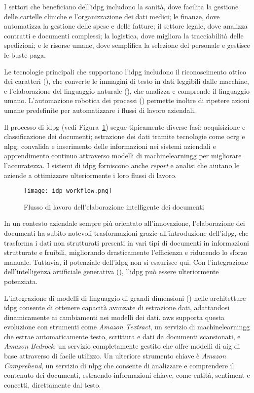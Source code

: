 I settori che beneficiano dell'\gls{idpg} includono la sanità, dove facilita la gestione delle cartelle cliniche e l'organizzazione dei dati medici; le finanze, dove automatizza la gestione delle spese e delle fatture; il settore legale, dove analizza contratti e documenti complessi; la logistica, dove migliora la tracciabilità delle spedizioni; e le risorse umane, dove semplifica la selezione del personale e gestisce le buste paga.

Le tecnologie principali che supportano l'\gls{idpg} includono il riconoscimento ottico dei caratteri (), che converte le immagini di testo in dati leggibili dalle macchine, e l'elaborazione del linguaggio naturale (), che analizza e comprende il linguaggio umano. L'automazione robotica dei processi () permette inoltre di ripetere azioni umane predefinite per automatizzare i flussi di lavoro aziendali.

Il processo di \gls{idpg} (vedi Figura~\ref{fig:idp_workflow}) segue tipicamente diverse fasi: acquisizione e classificazione dei documenti; estrazione dei dati tramite tecnologie come \gls{ocrg} e \gls{nlpg}; convalida e inserimento delle informazioni nei sistemi aziendali e apprendimento continuo attraverso modelli di \gls{machinelearningg} per migliorare l'accuratezza. I sistemi di \gls{idpg} forniscono anche \emph{report} e analisi che aiutano le aziende a ottimizzare ulteriormente i loro flussi di lavoro.

\begin{figure}[!ht]
    \centering
    \texttt{[image: idp\_workflow.png]}
    \caption{Flusso di lavoro dell'elaborazione intelligente dei documenti}
    \label{fig:idp_workflow}
\end{figure}

In un contesto aziendale sempre più orientato all'innovazione, l'elaborazione dei documenti ha subito notevoli trasformazioni grazie all'introduzione dell'\gls{idpg}, che trasforma i dati non strutturati presenti in vari tipi di documenti in informazioni strutturate e fruibili, migliorando drasticamente l'efficienza e riducendo lo sforzo manuale. Tuttavia, il potenziale dell'\gls{idpg} non si esaurisce qui. Con l'integrazione dell'intelligenza artificiale generativa (), l'\gls{idpg} può essere ulteriormente potenziata.

L'integrazione di modelli di linguaggio di grandi dimensioni () nelle architetture \gls{idpg} consente di ottenere capacità avanzate di estrazione dati, adattandosi dinamicamente ai cambiamenti nei modelli dei dati. \gls{aws} supporta questa evoluzione con strumenti come \emph{Amazon Textract}, un servizio di \gls{machinelearningg} che estrae automaticamente testo, scrittura e dati da documenti scansionati, e \emph{Amazon Bedrock}, un servizio completamente gestito che offre modelli di \gls{aig} di base attraverso  di facile utilizzo. Un ulteriore strumento chiave è \emph{Amazon Comprehend}, un servizio di \gls{nlpg} che consente di analizzare e comprendere il contenuto dei documenti, estraendo informazioni chiave, come entità, sentiment e concetti, direttamente dal testo.

